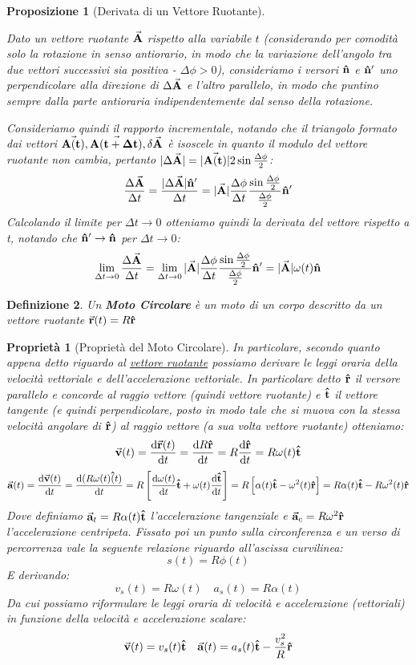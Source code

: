 \documentclass{article}
\newtheorem{property}{Proprietà}[section]
\newtheorem{defn}{Definizione}[section]
\newtheorem{prop}[defn]{Proposizione}
\renewcommand{\a}{\va{a}}
\renewcommand{\v}{\va{v}}
\newcommand{\verst}{\vu{t}}
\newcommand{\versr}{\vu{r}}
\renewcommand{\r}{\va{r}}
\newcommand{\normvs}{\vu{n}}
\begin{document}
\begin{prop}[Derivata di un Vettore Ruotante]
\hypertarget{vettruotante}{Dato un vettore ruotante $\va{A}$ rispetto alla variabile $t$ (considerando per comodità solo la rotazione in senso antiorario, in modo che la variazione dell'angolo tra due vettori successivi sia positiva - $\Delta\phi>0$), consideriamo i versori $\normvs$ e $\normvs'$ uno perpendicolare alla direzione di $\Delta \va{A}$ e l'altro parallelo, in modo che puntino sempre dalla parte antioraria indipendentemente dal senso della rotazione.}
Consideriamo quindi il rapporto incrementale, notando che il triangolo formato dai vettori $\va{A(t)},\va{A(t+\Delta t)},\delta\va{A}$ è isoscele in quanto il modulo del vettore ruotante non cambia, pertanto $|\Delta\va{A}|=|\va{A(t)}|2\sin{\frac{\Delta\phi}{2}}$:
\[\frac{\Delta \va{A}}{\Delta t}=\frac{|\Delta\va{A}|\normvs'}{\Delta t}=|\va{A}|\frac{\Delta\phi}{\Delta t}\frac{\sin{\frac{\Delta\phi}{2}}}{\frac{\Delta\phi}{2}}\normvs'\]
Calcolando il limite per $\Delta t\to 0$ otteniamo quindi la derivata del vettore rispetto a t, notando che $\normvs'\to\normvs$ per $\Delta t\to 0$:
\[\lim_{\Delta t\to 0}\frac{\Delta \va{A}}{\Delta t}=\lim_{\Delta t\to 0} |\va{A}|\frac{\Delta\phi}{\Delta t}\frac{\sin{\frac{\Delta\phi}{2}}}{\frac{\Delta\phi}{2}}\normvs'=|\va{A}|\omega(t)\normvs\]
\end{prop}

\begin{defn}
Un \textbf{Moto Circolare} è un moto di un corpo descritto da un vettore ruotante $\r(t)=R\versr$
\end{defn}

\begin{property}[Proprietà del Moto Circolare]
In particolare, secondo quanto appena detto riguardo al \hyperlink{vettruotante}{vettore ruotante} possiamo derivare le leggi oraria della velocità vettoriale e dell'accelerazione vettoriale. In particolare detto $\versr$ il versore parallelo e concorde al raggio vettore (quindi vettore ruotante) e $\verst$ il vettore tangente (e quindi perpendicolare, posto in modo tale che si muova con la stessa velocità angolare di $\versr$) al raggio vettore (a sua volta vettore ruotante) otteniamo:
\[\v(t)=\dv{\r(t)}{t}=\dv{R\versr}{t}=R\dv{\versr}{t}=R\omega(t)\vu{t}\]
\[\a(t)=\dv{\v(t)}{t}=\dv{(R\omega(t)\vu(t)}{t}=R\left[\dv{\omega(t)}{t}\vu{t}+\omega(t)\dv{\vu{t}}{t}\right]=R\left[\alpha(t)\vu{t}-\omega^2(t)\versr\right]=R\alpha(t)\vu{t}-R\omega^2(t)\versr\]
Dove definiamo $\a_t=R\alpha(t)\vu{t}$ l'accelerazione tangenziale e $\a_c=R\omega^2\vu{r}$ l'accelerazione centripeta.
Fissato poi un punto sulla circonferenza e un verso di percorrenza vale la seguente relazione riguardo all'ascissa curvilinea:
\[s(t)=R\phi(t)\]
E derivando:
\[v_s(t)=R\omega(t)\quad a_s(t)=R\alpha(t)\]
Da cui possiamo riformulare le leggi oraria di velocità e accelerazione (vettoriali) in funzione della velocità e accelerazione scalare:
\[\v(t)=v_s(t)\vu{t}\quad \a(t)=a_s(t)\vu{t}-\frac{v_s^2}{R}\versr\]
\end{property}
\end{document}
